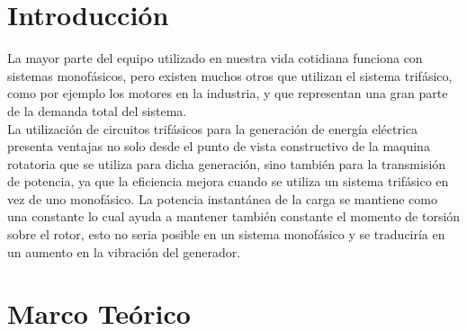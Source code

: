 \documentclass[twocolumn]{IEEEtran}
\begin{document}
\section{Introducción}
\noindent
La mayor parte del equipo utilizado en nuestra vida cotidiana funciona con sistemas monofásicos, pero existen muchos otros que utilizan el sistema trifásico, como por ejemplo los motores en la industria, y que representan una gran parte de la demanda total del sistema.\\
La utilización de circuitos trifásicos para la generación de energía eléctrica presenta  ventajas no solo desde el punto de vista constructivo de la maquina rotatoria que se utiliza para dicha generación, sino también para la transmisión de potencia, ya que la eficiencia mejora cuando se utiliza un sistema trifásico en vez de uno monofásico. La potencia instantánea de la carga se mantiene como una constante lo cual ayuda a mantener también constante el momento de torsión sobre el rotor, esto no seria posible en un sistema monofásico y se traduciría en un aumento en la vibración del generador.

\section{Marco Teórico}
\noindent
\end{document}
